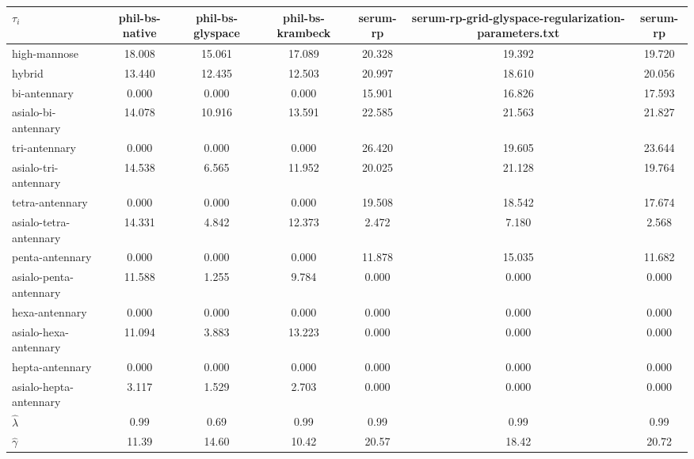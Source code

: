 \begin{table}
    \centering
    \small
    \begin{tabular}{l SSSSSS}
        \toprule
        $\tau_i$ & {phil-bs-native} & {phil-bs-glyspace} & {phil-bs-krambeck} & {serum-rp} & {serum-rp-grid-glyspace-regularization-parameters.txt} & {serum-rp}\\
        \midrule
        high-mannose & 18.008 & 15.061 & 17.089 & 20.328 & 19.392 & 19.720\\
        hybrid & 13.440 & 12.435 & 12.503 & 20.997 & 18.610 & 20.056\\
        bi-antennary & 0.000 & 0.000 & 0.000 & 15.901 & 16.826 & 17.593\\
        asialo-bi-antennary & 14.078 & 10.916 & 13.591 & 22.585 & 21.563 & 21.827\\
        tri-antennary & 0.000 & 0.000 & 0.000 & 26.420 & 19.605 & 23.644\\
        asialo-tri-antennary & 14.538 & 6.565 & 11.952 & 20.025 & 21.128 & 19.764\\
        tetra-antennary & 0.000 & 0.000 & 0.000 & 19.508 & 18.542 & 17.674\\
        asialo-tetra-antennary & 14.331 & 4.842 & 12.373 & 2.472 & 7.180 & 2.568\\
        penta-antennary & 0.000 & 0.000 & 0.000 & 11.878 & 15.035 & 11.682\\
        asialo-penta-antennary & 11.588 & 1.255 & 9.784 & 0.000 & 0.000 & 0.000\\
        hexa-antennary & 0.000 & 0.000 & 0.000 & 0.000 & 0.000 & 0.000\\
        asialo-hexa-antennary & 11.094 & 3.883 & 13.223 & 0.000 & 0.000 & 0.000\\
        hepta-antennary & 0.000 & 0.000 & 0.000 & 0.000 & 0.000 & 0.000\\
        asialo-hepta-antennary & 3.117 & 1.529 & 2.703 & 0.000 & 0.000 & 0.000\\
        \midrule
        ${\hat \lambda}$ & 0.99 & 0.69 & 0.99 & 0.99 & 0.99 & 0.99\\
        ${\hat \gamma}$ & 11.39 & 14.60 & 10.42 & 20.57 & 18.42 & 20.72\\
        \bottomrule
    \end{tabular}
\end{table}